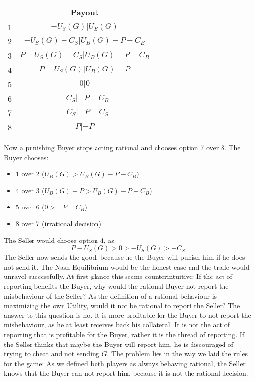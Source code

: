 \documentclass{cacthesis}
\begin{document}
\begin{center}
\begin{tabular}{ |c|c| }
\hline
& Payout  \\
\hline
\hline
1& $-U_S(G) | U_B(G)$\\
\hline
2& $-U_S(G) - C_S| U_B(G)- P - C_B $\\
\hline
3&$P-U_S(G) - C_S | U_B(G) -P - C_B$ \\
\hline
4& $P-U_S(G)| U_B(G)-P$\\
\hline
5& $0|0$\\
\hline 
6& $-C_S |-P - C_B$\\
\hline
7& $- C_S| -P-C_S$\\
\hline
8& $P| -P$\\
\hline
\end{tabular}
\end{center}
Now a punishing Buyer stops acting rational and chooses option 7 over 8.\newline
The Buyer chooses:
\begin{itemize}
    \item 1 over 2 ($U_B(G) > U_B(G) -P -C_B$)
    \item 4 over 3 ($U_B(G) - P > U_B(G) -P -C_B$)
    \item 5 over 6 ($0 > -P -C_B$)
    \item 8 over 7 (irrational decision)
\end{itemize}
The Seller would choose option 4, as 
\[P-U_S(G)>0>-U_S(G)>-C_S\]
The Seller now sends the good, because he the Buyer will punish him if he does not send it.
The Nash Equilibrium would be the honest case and the trade would unravel successfully.\newline
At first glance this seems counterintuitive: If the act of reporting benefits the Buyer, why would the rational Buyer not report the misbehaviour of the Seller? As the definition of a rational behaviour is maximizing the own Utility, would it not be rational to report the Seller?\newline
The answer to this question is no. It is more profitable for the Buyer to not report the misbehaviour, as he at least receives back his collateral.\newline
It is not the act of reporting that is profitable for the Buyer, rather it is the thread of reporting. If the Seller thinks that maybe the Buyer will report him, he is discouraged of trying to cheat and not sending $G$.\newline
The problem lies in the way we laid the rules for the game: As we defined both players as always behaving rational, the Seller knows that the Buyer can not report him, because it is not the rational decision.\newline
\end{document}
